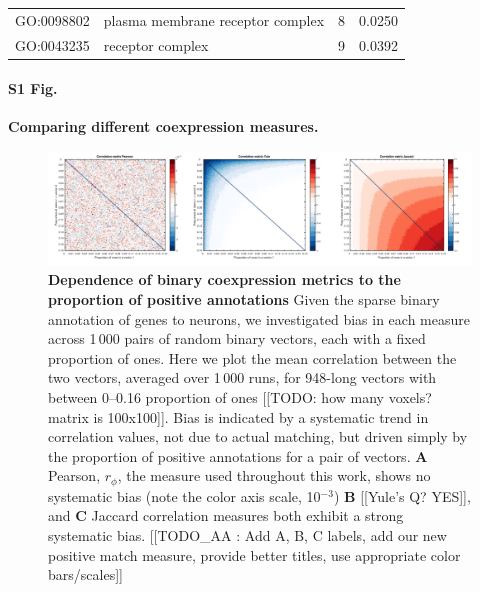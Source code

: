 \documentclass[10pt,letterpaper]{article}
\begin{document}
\begin{table}[]
\begin{tabular}{llcc}
GO:0098802                                 & plasma membrane receptor complex                           & 8                                                                                        & 0.0250                                \\
GO:0043235                                 & receptor complex                                           & 9                                                                                        & 0.0392                               
\end{tabular}
\end{table}
\clearpage


\paragraph*{S1 Fig.}
{\bf Comparing different coexpression measures.}
\begin{figure}[h]
\centering
    \includegraphics[width=1\textwidth]{CoexpressionMeasures.pdf}
\caption{
\label{fig:S_propOnes}
\textbf{Dependence of binary coexpression metrics to the proportion of positive annotations}
Given the sparse binary annotation of genes to neurons, we investigated bias in each measure across 1\,000 pairs of random binary vectors, each with a fixed proportion of ones.
Here we plot the mean correlation between the two vectors, averaged over 1\,000 runs, for 948-long vectors with between 0--0.16 proportion of ones [[TODO: how many voxels?matrix is 100x100]].
Bias is indicated by a systematic trend in correlation values, not due to actual matching, but driven simply by the proportion of positive annotations for a pair of vectors.
\textbf{A} Pearson, $r_\phi$, the measure used throughout this work, shows no systematic bias (note the color axis scale, 10$^{-3}$)
\textbf{B} [[Yule's Q? YES]], and \textbf{C} Jaccard correlation measures both exhibit a strong systematic bias.
[[TODO_AA   : Add A, B, C labels, add our new positive match measure, provide better titles, use appropriate color bars/scales]]
}
\end{figure}
\end{document}
